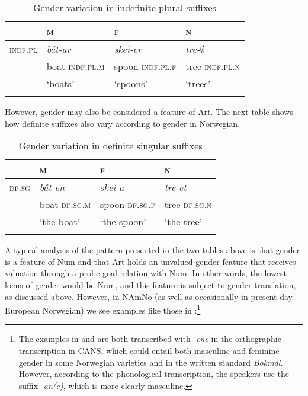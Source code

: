 \documentclass[output=paper]{langscibook}
\begin{document}
\begin{table}[H]
\begin{tabular}{l lll}
\lsptoprule
                 & \textsc{m} & \textsc{f} & \textsc{n}\\\midrule
\textsc{indf.pl} & \textit{båt-ar} & \textit{skei-er} & \textit{tre-$\emptyset$}\\
& boat-\textsc{indf.pl.m} & spoon-\textsc{indf.pl.f} & tree-\textsc{indf.pl.n}\\
& ‘boats’ & ‘spoons’ & ‘trees’\\
\lspbottomrule
\end{tabular}
\caption{Gender variation in indefinite plural suffixes}
\label{tab:riksem:3}
\end{table}



However, gender may also be considered a feature of Art. The next table shows how definite suffixes also vary according to gender in Norwegian.  


\begin{table}[h]
\begin{tabular}{l lll}
\lsptoprule
 & \textsc{m} & \textsc{f} & \textsc{n}\\\midrule
\textsc{df.sg} & \textit{båt-en} & \textit{skei-a} & \textit{tre-et}\\
& boat-\textsc{df.sg.m} & spoon-\textsc{df.sg.f} & tree-\textsc{df.sg.n}\\
& ‘the boat’ & ‘the spoon’ & ‘the tree’\\
\lspbottomrule
\end{tabular}
\caption{Gender variation in definite singular suffixes}
\label{tab:riksem:4}
\end{table}


A typical analysis of the pattern presented in the two tables above is that gender is a feature of Num and that Art holds an unvalued gender feature that receives valuation through a probe-goal relation with Num. In other words, the lowest locus of gender would be Num, and this feature is subject to gender translation, as discussed above. However, in NAmNo (as well as occasionally in present-day European Norwegian) we see examples like those in :\footnote{ \textrm{The examples in  and  are both transcribed with -}\textrm{\textit{ene} }\textrm{in the orthographic transcription in CANS, which could entail both masculine and feminine gender in some Norwegian varieties and in the written standard} \textrm{\textit{Bokmål.} }\textrm{However, according to the phonological transcription, the speakers use the suffix} \textrm{\textit{{}-an(e)}}\textrm{, which is more clearly masculine.}}
\end{document}
